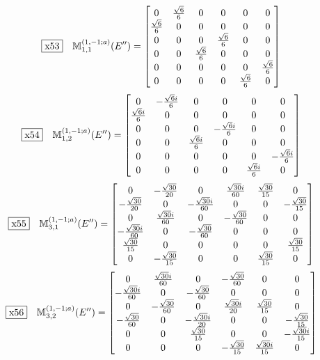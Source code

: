 \documentclass[fleqn,10pt,landscape]{jsarticle}
\begin{document}
\begin{dmath*}
\fbox{x53}\quad \mathbb{M}_{1,1}^{(1,-1;a)}(E^{\prime\prime})=\begin{bmatrix} 0 & \frac{\sqrt{6}}{6} & 0 & 0 & 0 & 0 \\ \frac{\sqrt{6}}{6} & 0 & 0 & 0 & 0 & 0 \\ 0 & 0 & 0 & \frac{\sqrt{6}}{6} & 0 & 0 \\ 0 & 0 & \frac{\sqrt{6}}{6} & 0 & 0 & 0 \\ 0 & 0 & 0 & 0 & 0 & \frac{\sqrt{6}}{6} \\ 0 & 0 & 0 & 0 & \frac{\sqrt{6}}{6} & 0 \end{bmatrix}
\end{dmath*}
\begin{dmath*}
\fbox{x54}\quad \mathbb{M}_{1,2}^{(1,-1;a)}(E^{\prime\prime})=\begin{bmatrix} 0 & - \frac{\sqrt{6} i}{6} & 0 & 0 & 0 & 0 \\ \frac{\sqrt{6} i}{6} & 0 & 0 & 0 & 0 & 0 \\ 0 & 0 & 0 & - \frac{\sqrt{6} i}{6} & 0 & 0 \\ 0 & 0 & \frac{\sqrt{6} i}{6} & 0 & 0 & 0 \\ 0 & 0 & 0 & 0 & 0 & - \frac{\sqrt{6} i}{6} \\ 0 & 0 & 0 & 0 & \frac{\sqrt{6} i}{6} & 0 \end{bmatrix}
\end{dmath*}
\begin{dmath*}
\fbox{x55}\quad \mathbb{M}_{3,1}^{(1,-1;a)}(E^{\prime\prime})=\begin{bmatrix} 0 & - \frac{\sqrt{30}}{20} & 0 & \frac{\sqrt{30} i}{60} & \frac{\sqrt{30}}{15} & 0 \\ - \frac{\sqrt{30}}{20} & 0 & - \frac{\sqrt{30} i}{60} & 0 & 0 & - \frac{\sqrt{30}}{15} \\ 0 & \frac{\sqrt{30} i}{60} & 0 & - \frac{\sqrt{30}}{60} & 0 & 0 \\ - \frac{\sqrt{30} i}{60} & 0 & - \frac{\sqrt{30}}{60} & 0 & 0 & 0 \\ \frac{\sqrt{30}}{15} & 0 & 0 & 0 & 0 & \frac{\sqrt{30}}{15} \\ 0 & - \frac{\sqrt{30}}{15} & 0 & 0 & \frac{\sqrt{30}}{15} & 0 \end{bmatrix}
\end{dmath*}
\begin{dmath*}
\fbox{x56}\quad \mathbb{M}_{3,2}^{(1,-1;a)}(E^{\prime\prime})=\begin{bmatrix} 0 & \frac{\sqrt{30} i}{60} & 0 & - \frac{\sqrt{30}}{60} & 0 & 0 \\ - \frac{\sqrt{30} i}{60} & 0 & - \frac{\sqrt{30}}{60} & 0 & 0 & 0 \\ 0 & - \frac{\sqrt{30}}{60} & 0 & \frac{\sqrt{30} i}{20} & \frac{\sqrt{30}}{15} & 0 \\ - \frac{\sqrt{30}}{60} & 0 & - \frac{\sqrt{30} i}{20} & 0 & 0 & - \frac{\sqrt{30}}{15} \\ 0 & 0 & \frac{\sqrt{30}}{15} & 0 & 0 & - \frac{\sqrt{30} i}{15} \\ 0 & 0 & 0 & - \frac{\sqrt{30}}{15} & \frac{\sqrt{30} i}{15} & 0 \end{bmatrix}
\end{dmath*}
\end{document}
